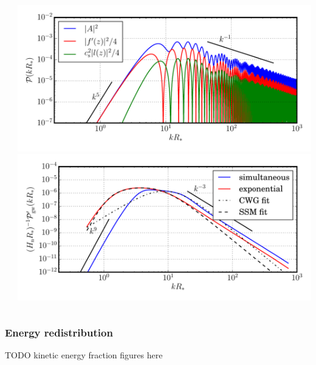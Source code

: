 \begin{frame}
\begin{columns}
\begin{column}{0.3\textwidth}
    \end{column}
    \begin{column}{0.4\textwidth}
        \includegraphics[width=\textwidth]{../fig/one_bub_vw0.44alpha0.05_nz5k_nx10k-final3}
        \includegraphics[width=\textwidth]{../fig/pow_gw_vw0.44alpha0.05_sim_1.0_exp_1.0_nz5k_nx10k_nT1000-final3}
    \end{column}
    \end{columns}
\end{frame}

\iffalse
\begin{frame}
    \frametitle{Energy redistribution}
    TODO kinetic energy fraction figures here
\end{frame}

